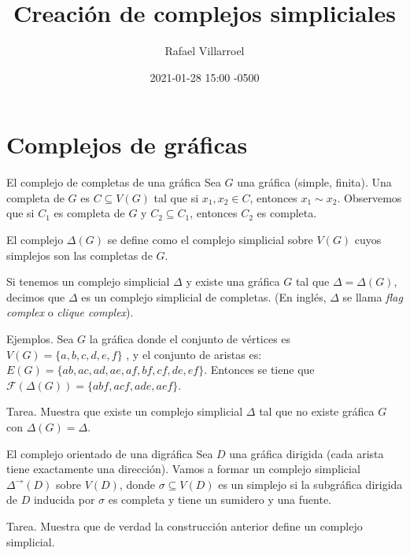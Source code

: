 \documentclass[spanish, presentation]{beamer}
\author{Rafael Villarroel}
\date{2021-01-28 15:00 -0500}
\title{Creación de complejos simpliciales}
\begin{document}
\maketitle
{}

\section{Complejos de gráficas}
\label{sec:org5b3af85}

\begin{frame}[label={sec:org201fa53}]{El complejo de completas de una gráfica}
Sea \(G\) una gráfica (simple, finita). Una \alert{completa} de \(G\) es \(C\subseteq V(G)\) tal que si \(x_{1},x_{2}\in C\), entonces \(x_{1}\sim x_{2}\). Observemos que si \(C_{1}\) es completa de \(G\) y \(C_{2}\subseteq C_{1}\), entonces \(C_{2}\) es completa.

El complejo \(\Delta(G)\) se define como el complejo simplicial sobre \(V(G)\) cuyos simplejos son las completas de \(G\).

Si tenemos un complejo simplicial \(\Delta\) y existe una gráfica \(G\) tal que \(\Delta=\Delta(G)\), decimos que \(\Delta\) es un \alert{complejo simplicial de completas}. (En inglés, \(\Delta\) se llama \emph{flag complex} o \emph{clique complex}).

\alert{Ejemplos}. Sea \(G\) la gráfica donde el conjunto de vértices es \(V(G)=\{a,b,c,d,e,f\}\) , y el conjunto de aristas es: \(E(G)=\{ab,ac,ad,ae,af,bf,cf,de,ef\}\). Entonces se tiene que \(\mathcal{F}(\Delta(G))=\{abf,acf,ade,aef\}\).

\alert{Tarea}. Muestra que existe un complejo simplicial \(\Delta\) tal que no existe gráfica \(G\) con \(\Delta(G)=\Delta\).
\end{frame}

\begin{frame}[label={sec:orgfcb2b74}]{El complejo orientado de una digráfica}
Sea \(D\) una gráfica dirigida (cada arista tiene exactamente una dirección).  Vamos a formar un complejo simplicial \(\Delta^{\to}(D)\) sobre \(V(D)\), donde \(\sigma\subseteq V(D)\) es un simplejo si la subgráfica dirigida de \(D\) inducida por \(\sigma\) es completa y tiene un sumidero y una fuente.

\alert{Tarea.} Muestra que de verdad la construcción anterior define un complejo simplicial.
\end{frame}
\end{document}
